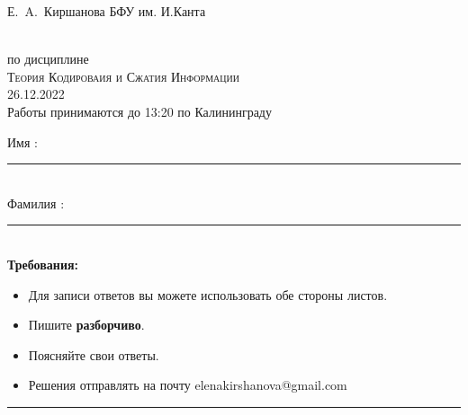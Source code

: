 \documentclass[12pt,a4paper]{scrartcl}
\newcounter{auf}
\begin{document}
Е.\ A.\ Киршанова \hfill БФУ им. И.Канта \\





\begin{center}
  \LARGE
  \\[1ex]
  \Large
  по дисциплине \\[1ex]
  \textsc{Теория Кодироваия и Сжатия Информации}\\[2ex]
  \large
 26.12.2022\\
Работы принимаются до 13:20 по Калининграду
\end{center}
\vspace*{1.5cm}


Имя   :\\[-2.2ex] \rule{0.9\textwidth}{.2pt}\\[2ex]
Фамилия : \\ [-2.2ex] \rule{0.9\textwidth}{.2pt}\\[1ex]

\vspace*{1.5cm}
\textbf{Требования:}
\begin{itemize}
 \item Для записи ответов вы можете использовать обе стороны листов.
  \item Пишите \textbf{разборчиво}.
  \item Поясняйте свои ответы.
  \item Решения отправлять на почту elenakirshanova@gmail.com
    
    
  
\end{itemize}

\rule{\textwidth}{.2pt}
\vfill
\end{document}
